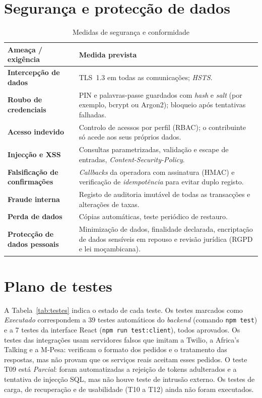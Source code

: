 \documentclass[12pt,a4paper,openany]{report}
\begin{document}
\section{Segurança e protecção de dados}
\begin{table}[!htbp]
\caption{Medidas de segurança e conformidade}\label{tab:seg}
\begingroup\singlespacing\small
\begin{tabularx}{\textwidth}{@{}>{\bfseries}p{3.8cm}X@{}}
\toprule
Ameaça / exigência & Medida prevista \\
\midrule
Intercepção de dados & TLS~1.3 em todas as comunicações; \emph{HSTS}. \\
Roubo de credenciais & PIN e palavras-passe guardados com \emph{hash} e \emph{salt} (por exemplo, bcrypt ou Argon2); bloqueio após tentativas falhadas. \\
Acesso indevido & Controlo de acessos por perfil (RBAC); o contribuinte só acede aos seus próprios dados. \\
Injecção e XSS & Consultas parametrizadas, validação e escape de entradas, \emph{Content-Security-Policy}. \\
Falsificação de confirmações & \emph{Callbacks} da operadora com assinatura (HMAC) e verificação de \emph{idempotência} para evitar duplo registo. \\
Fraude interna & Registo de auditoria imutável de todas as transacções e alterações de taxas. \\
Perda de dados & Cópias automáticas, teste periódico de restauro. \\
Protecção de dados pessoais & Minimização de dados, finalidade declarada, encriptação de dados sensíveis em repouso e revisão jurídica (RGPD e lei moçambicana). \\
\bottomrule
\end{tabularx}
\endgroup
\end{table}

\section{Plano de testes}
A Tabela~\ref{tab:testes} indica o estado de cada teste. Os testes marcados como \emph{Executado} correspondem a 39 testes automáticos do \emph{backend} (comando \texttt{npm test}) e a 7 testes da interface React (\texttt{npm run test:client}), todos aprovados. Os testes das integrações usam servidores falsos que imitam a Twilio, a Africa's Talking e a M-Pesa: verificam o formato dos pedidos e o tratamento das respostas, mas não provam que os serviços reais aceitam esses pedidos. O teste T09 está \emph{Parcial}: foram automatizadas a rejeição de tokens adulterados e a tentativa de injecção SQL, mas não houve teste de intrusão externo. Os testes de carga, de recuperação e de usabilidade (T10 a T12) ainda não foram executados.
\end{document}
